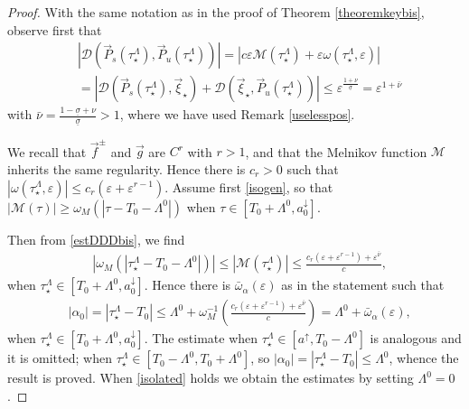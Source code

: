 \documentclass[10pt]{article}
\numberwithin{equation}{section}
\def\ep{\varepsilon}
\def\MM{{\mathcal M}}
\def\DDD{\mathscr{D}}
\def\aup{a^{\uparrow}}
\def\adown{a^{\downarrow}}
\def\lzero{\Lambda^0}
\def\P{\vec{P}}
\def\xxi{\vec{\xi}}
\def\f{\vec{f}}
\def\g{\vec{g}}
\theoremstyle{definition}
\theoremstyle{remark}
\begin{document}
\begin{proof}
With the same notation as in the proof of Theorem \ref{theoremkeybis},
observe first that
 \begin{equation}\label{estDDDbis}
				\begin{split}
					&|\DDD(\P_s(\tau_\star^{\Lambda}), \P_u(\tau_\star^{\Lambda}))|= |c \ep \MM(\tau_\star^{\Lambda})+\ep
\omega(\tau_\star^{\Lambda},\ep)|    \\
					& =|\DDD(\P_s(\tau_\star^{\Lambda}), \xxi_\star )+\DDD( \xxi_\star, \P_u(\tau_\star^{\Lambda}))| \le
\ep^{\frac{1+\nu}{\underline{\sigma}}}=
\ep^{1+\bar{\nu}}
				\end{split}
		\end{equation}
  with $\bar{\nu}= \frac{1-\underline{\sigma}+\nu}{\underline{\sigma}}>1$, where we have used Remark \ref{uselesspos}.

 We recall that $\f^{\pm}$ and $\g$ are $C^r$ with $r>1$, and that the Melnikov function $\MM$ inherits the same regularity.
 Hence there is
 $c_r>0$ such that $|\omega(\tau_\star^{\Lambda},\ep)|\le c_r (\ep+\ep^{r-1})$.
 Assume first  \eqref{isogen},  so that  $|\MM(\tau)| \ge \omega_M(|\tau-T_0-\lzero|)$  when $ \tau \in [T_0+\lzero, \adown_0]$.

 Then from \eqref{estDDDbis}, we find
  \begin{equation}\label{xxi12bis}
  \begin{split}
      & |\omega_M(|\tau_\star^{\Lambda}-T_0-\lzero|)| \le  |\MM(\tau_\star^{\Lambda})| \le   \frac{c_r (\ep+ \ep^{r-1})+
      \ep^{\bar{\nu}}}{c},
  \end{split}
  \end{equation}
  when $ \tau_\star^{\Lambda} \in [T_0+\lzero, \adown_0]$. Hence there is $\bar{\omega}_{\alpha}(\ep)$ as in the statement such
  that
  \begin{equation}\label{tau12}
  \begin{split}
      &   |\alpha_0| =|\tau_\star^{\Lambda}-T_0|  \le \lzero + \omega_M^{-1}\left(  \frac{c_r (\ep+ \ep^{r-1})+ \ep^{\bar{\nu}}}{c}
      \right)=\lzero +\bar{\omega}_{\alpha}(\ep),
  \end{split}
  \end{equation}
    when $ \tau_\star^{\Lambda} \in [T_0+\lzero, \adown_0]$. The estimate when  $\tau_\star^{\Lambda} \in [\aup, T_0-\lzero]$
  is analogous and it is omitted;
    when $\tau_\star^{\Lambda} \in[T_0-\lzero, T_0+\lzero]$, so $|\alpha_0|= |\tau_\star^{\Lambda}-T_0| \le \lzero$, whence the result
    is proved.
  When \eqref{isolated} holds we obtain the estimates by setting $\lzero=0$.



\end{proof}
\end{document}
